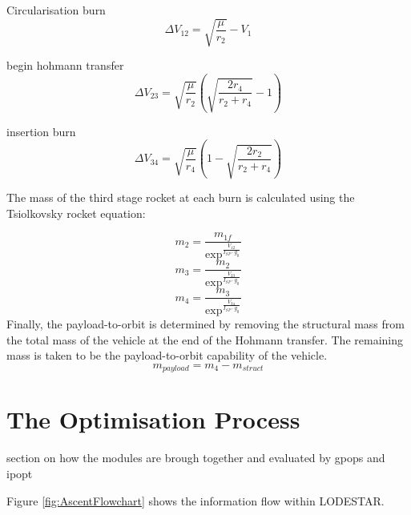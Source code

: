 Circularisation burn
\begin{equation}
\Delta V_{12} = \sqrt{\dfrac{\mu}{r_2}} - V_1
\end{equation}

begin hohmann transfer
\begin{equation}
\Delta V_{23} = \sqrt{\dfrac{\mu}{r_2}} \left( \sqrt{\dfrac{2r_4}{r_2 + r_4}} -1 \right)
\end{equation}

insertion burn
\begin{equation}
\Delta V_{34} = \sqrt{\dfrac{\mu}{r_4}} \left(1- \sqrt{\dfrac{2r_2}{r_2 + r_4}}  \right)
\end{equation}


The mass of the third stage rocket at each burn is calculated using the Tsiolkovsky rocket equation:

\begin{equation}
m_2 = \frac{m_{1f}}{\exp^{\frac{V_{12}}{I_{SP} \cdot g_0}}}
\end{equation}
\begin{equation}
m_3 = \frac{m_{2}}{\exp^{\frac{V_{23}}{I_{SP} \cdot g_0}}}
\end{equation}
\begin{equation}
m_4 = \frac{m_{3}}{\exp^{\frac{V_{34}}{I_{SP} \cdot g_0}}}
\end{equation}
Finally, the payload-to-orbit is determined by removing the structural mass from the total mass of the vehicle at the end of the Hohmann transfer. The remaining mass is taken to be the payload-to-orbit capability of the vehicle.
\begin{equation}
m_{payload} = m_4 - m_{struct}
\end{equation}







\section{The Optimisation Process}

section on how the modules are brough together and evaluated by gpops and ipopt


Figure \ref{fig:AscentFlowchart} shows the information flow within LODESTAR. 

